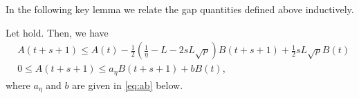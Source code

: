 \documentclass[leqno,onefignum,onetabnum]{siamart0516}
\newcommand{\xb}{\mathbf{x}}
\begin{document}
%
In the following key lemma we relate the gap quantities defined above inductively.
\begin{lemma}\label{lemma: EB_2}
	Let  hold. Then, we have 
	\begin{align*}
	& A(t+s+1)  \le A(t) - \tfrac{1}{2}(\tfrac{1}{\eta} - L - 2sL \sqrt{p}) B(t+s+1) + \tfrac{1}{2}sL\sqrt{p} B(t) \\
	& 0 \le A(t+s+1) \le a_\eta B(t+s+1) + b B(t),
	\end{align*}
	where $a_\eta$ and $b$ are given in \eqref{eq:ab} below.
\end{lemma}
\end{document}
